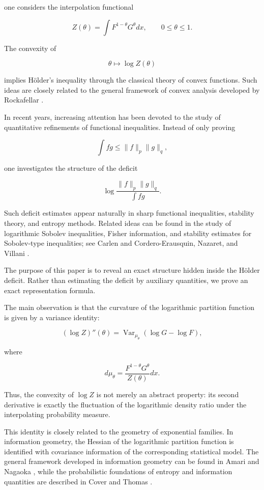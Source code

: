 \documentclass[11pt]{amsart}
\begin{document}
one considers the interpolation functional

\[
Z(\theta)
=
\int
F^{1-\theta}G^\theta dx ,
\qquad
0\leq\theta\leq1 .
\]

The convexity of

\[
\theta\mapsto \log Z(\theta)
\]

implies Hölder's inequality through the classical theory of convex
functions. Such ideas are closely related to the general framework
of convex analysis developed by Rockafellar \cite{Rockafellar1970}.


In recent years, increasing attention has been devoted to the study
of quantitative refinements of functional inequalities. Instead of
only proving

\[
\int fg\leq \|f\|_p\|g\|_q ,
\]

one investigates the structure of the deficit

\[
\log
\frac{
\|f\|_p\|g\|_q
}{
\int fg
}.
\]

Such deficit estimates appear naturally in sharp functional
inequalities, stability theory, and entropy methods. Related ideas
can be found in the study of logarithmic Sobolev inequalities,
Fisher information, and stability estimates for Sobolev-type
inequalities; see Carlen \cite{Carlen1991} and
Cordero-Erausquin, Nazaret, and Villani \cite{CorderoErausquin2004}.


The purpose of this paper is to reveal an exact structure hidden
inside the Hölder deficit. Rather than estimating the deficit by
auxiliary quantities, we prove an exact representation formula.

The main observation is that the curvature of the logarithmic
partition function is given by a variance identity:

\[
(\log Z)''(\theta)
=
\operatorname{Var}_{\mu_\theta}
(
\log G-\log F
),
\]

where

\[
d\mu_\theta
=
\frac{
F^{1-\theta}G^\theta
}{
Z(\theta)
}
dx .
\]

Thus, the convexity of $\log Z$ is not merely an abstract property:
its second derivative is exactly the fluctuation of the logarithmic
density ratio under the interpolating probability measure.


This identity is closely related to the geometry of exponential
families. In information geometry, the Hessian of the logarithmic
partition function is identified with covariance information of the
corresponding statistical model. The general framework developed in
information geometry can be found in Amari and Nagaoka
\cite{Amari2000}, while the probabilistic foundations of entropy and
information quantities are described in Cover and Thomas
\cite{CoverThomas2006}.
\end{document}

